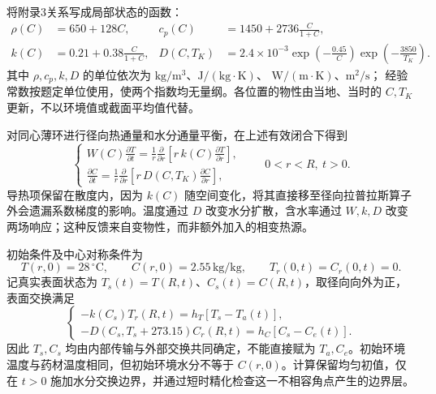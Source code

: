 将附录3关系写成局部状态的函数：
\begin{equation}
\begin{aligned}
\rho(C)&=650+128C,
&c_p(C)&=1450+2736\frac{C}{1+C},\\
k(C)&=0.21+0.38\frac{C}{1+C},
&D(C,T_K)&=2.4\times10^{-3}
  \exp\!\left(-\frac{0.45}{C}\right)
  \exp\!\left(-\frac{3850}{T_K}\right).
\end{aligned}
\label{eq:q2-properties}
\end{equation}
其中 \(\rho,c_p,k,D\) 的单位依次为
\(\mathrm{kg/m^3}\)、\(\mathrm{J/(kg\cdot K)}\)、
\(\mathrm{W/(m\cdot K)}\)、\(\mathrm{m^2/s}\)；
经验常数按题定单位使用，使两个指数均无量纲。各位置的物性由当地、当时的 \(C,T_K\) 更新，不以环境值或截面平均值代替。

对同心薄环进行径向热通量和水分通量平衡，在上述有效闭合下得到
\begin{equation}
\begin{cases}
\displaystyle
W(C)\frac{\partial T}{\partial t}
=\frac{1}{r}\frac{\partial}{\partial r}
 \left[r\,k(C)\frac{\partial T}{\partial r}\right],\\[6pt]
\displaystyle
\frac{\partial C}{\partial t}
=\frac{1}{r}\frac{\partial}{\partial r}
 \left[r\,D(C,T_K)\frac{\partial C}{\partial r}\right],
\end{cases}
\qquad 0<r<R,\ t>0 .
\label{eq:q2-pde}
\end{equation}
导热项保留在散度内，因为 \(k(C)\) 随空间变化，将其直接移至径向拉普拉斯算子外会遗漏系数梯度的影响。温度通过 \(D\) 改变水分扩散，含水率通过 \(W,k,D\) 改变两场响应；这种反馈来自变物性，而非额外加入的相变热源。

初始条件及中心对称条件为
\begin{equation}
T(r,0)=28\,^{\circ}\mathrm C,\qquad
C(r,0)=2.55\,\mathrm{kg/kg},\qquad
T_r(0,t)=C_r(0,t)=0 .
\label{eq:q2-initial-centre}
\end{equation}
记真实表面状态为 \(T_s(t)=T(R,t)\)、\(C_s(t)=C(R,t)\)，取径向向外为正，表面交换满足
\begin{equation}
\begin{cases}
-k(C_s)T_r(R,t)=h_T[T_s-T_a(t)],\\
-D(C_s,T_s+273.15)C_r(R,t)=h_C[C_s-C_e(t)].
\end{cases}
\label{eq:q2-robin}
\end{equation}
因此 \(T_s,C_s\) 均由内部传输与外部交换共同确定，不能直接赋为 \(T_a,C_e\)。初始环境温度与药材温度相同，但初始环境水分不等于 \(C(r,0)\)。计算保留均匀初值，仅在 \(t>0\) 施加水分交换边界，并通过短时精化检查这一不相容角点产生的边界层。

